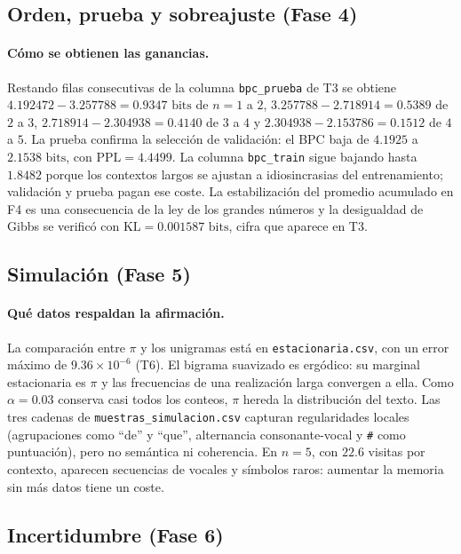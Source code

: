 \documentclass[11pt,letterpaper]{article}
\begin{document}
	\subsection{Orden, prueba y sobreajuste (Fase 4)}
	
	\paragraph{Cómo se obtienen las ganancias.}
	Restando filas consecutivas de la columna \texttt{bpc\_prueba} de T3 se obtiene $4.192472 - 3.257788 = 0.9347\text{ bits}$ de $n = 1$ a $2$, $3.257788 - 2.718914 = 0.5389$ de $2$ a $3$, $2.718914 - 2.304938 = 0.4140$ de $3$ a $4$ y $2.304938 - 2.153786 = 0.1512$ de $4$ a $5$. La prueba confirma la selección de validación: el BPC baja de $4.1925$ a $2.1538\text{ bits}$, con $\mathrm{PPL} = 4.4499$. La columna \texttt{bpc\_train} sigue bajando hasta $1.8482$ porque los contextos largos se ajustan a idiosincrasias del entrenamiento; validación y prueba pagan ese coste. La estabilización del promedio acumulado en F4 es una consecuencia de la ley de los grandes números y la desigualdad de Gibbs se verificó con $\mathrm{KL} = 0.001587\text{ bits}$, cifra que aparece en T3.
	
	\subsection{Simulación (Fase 5)}
	
	\paragraph{Qué datos respaldan la afirmación.}
	La comparación entre $\pi$ y los unigramas está en \texttt{estacionaria.csv}, con un error máximo de $9.36 \times 10^{-6}$ (T6). El bigrama suavizado es ergódico: su marginal estacionaria es $\pi$ y las frecuencias de una realización larga convergen a ella. Como $\alpha = 0.03$ conserva casi todos los conteos, $\pi$ hereda la distribución del texto. Las tres cadenas de \texttt{muestras\_simulacion.csv} capturan regularidades locales (agrupaciones como ``de'' y ``que'', alternancia consonante-vocal y \texttt{\#} como puntuación), pero no semántica ni coherencia. En $n = 5$, con $22.6$ visitas por contexto, aparecen secuencias de vocales y símbolos raros: aumentar la memoria sin más datos tiene un coste.
	
	\subsection{Incertidumbre (Fase 6)}
	
\end{document}
